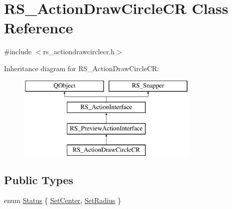 \hypertarget{classRS__ActionDrawCircleCR}{\section{R\-S\-\_\-\-Action\-Draw\-Circle\-C\-R Class Reference}
\label{classRS__ActionDrawCircleCR}
}


{\ttfamily \#include $<$rs\-\_\-actiondrawcirclecr.\-h$>$}

Inheritance diagram for R\-S\-\_\-\-Action\-Draw\-Circle\-C\-R\-:\begin{figure}[H]
\begin{center}
\leavevmode
\includegraphics[height=4.000000cm]{classRS__ActionDrawCircleCR}
\end{center}
\end{figure}
\subsection*{Public Types}
\begin{DoxyCompactItemize}
\item 
enum \hyperlink{classRS__ActionDrawCircleCR_a8ce78a24062dec2461eea464737803c3}{Status} \{ \hyperlink{classRS__ActionDrawCircleCR_a8ce78a24062dec2461eea464737803c3a4566ad083bf6e287cd3a21a0ef2af59b}{Set\-Center}, 
\hyperlink{classRS__ActionDrawCircleCR_a8ce78a24062dec2461eea464737803c3a5fdbb75d8d680070ba7311b9421f6022}{Set\-Radius}
 \}
\end{DoxyCompactItemize}
